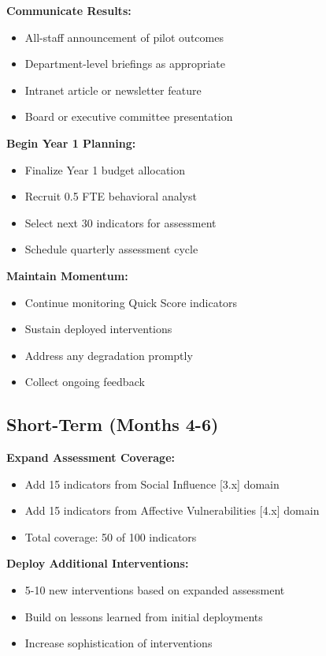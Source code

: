 \documentclass[11pt,a4paper]{article}
\begin{document}
\textbf{Communicate Results:}
\begin{itemize}
\item All-staff announcement of pilot outcomes
\item Department-level briefings as appropriate
\item Intranet article or newsletter feature
\item Board or executive committee presentation
\end{itemize}

\textbf{Begin Year 1 Planning:}
\begin{itemize}
\item Finalize Year 1 budget allocation
\item Recruit 0.5 FTE behavioral analyst
\item Select next 30 indicators for assessment
\item Schedule quarterly assessment cycle
\end{itemize}

\textbf{Maintain Momentum:}
\begin{itemize}
\item Continue monitoring Quick Score indicators
\item Sustain deployed interventions
\item Address any degradation promptly
\item Collect ongoing feedback
\end{itemize}

\subsection{Short-Term (Months 4-6)}

\textbf{Expand Assessment Coverage:}
\begin{itemize}
\item Add 15 indicators from Social Influence [3.x] domain
\item Add 15 indicators from Affective Vulnerabilities [4.x] domain
\item Total coverage: 50 of 100 indicators
\end{itemize}

\textbf{Deploy Additional Interventions:}
\begin{itemize}
\item 5-10 new interventions based on expanded assessment
\item Build on lessons learned from initial deployments
\item Increase sophistication of interventions
\end{itemize}
\end{document}
